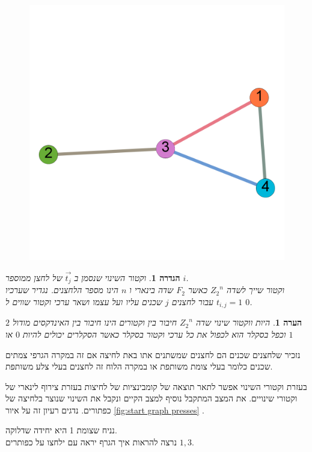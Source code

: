\documentclass[12pt,twoside]{article}
\newtheorem{definition}{הגדרה}[section]
\newtheorem{comm}{הערה}[section]
\newcommand{\Zn}{{Z_2}^n}
\begin{document}
\begin{figure}[ht]
    \caption{}
    \label{fig:numbering_graph}
    \unsethebrew
    \centering
    \includegraphics[width=.7\textwidth,height=.7\textheight,keepaspectratio]{images/numbering_graph.PNG}
\end{figure}
\sethebrew

\begin{definition}
    וקטור השינוי
    שנסמן ב
    $\vec{t_j}$
    של לחצן
    ממוספר
    $i$.
    \\
    וקטור
    שייך 
    לשדה 
    $\Zn$
    כאשר 
    $F_2$
    שדה בינארי
    ו 
    $n$
    הינו מספר הלחצנים.
    נגדיר שערכיו
    $t_{i,j} = 1$
    עבור
    לחצנים
    $j$
    שכנים עליו ועל עצמו
    ושאר ערכי וקטור שווים ל
    $0$.
\end{definition}

\begin{comm}
    היות ווקטור שינוי שדה
    $\Zn$
    חיבור בין וקטורים הינו חיבור בין האינדקסים מודול 
    $2$
    וכפל בסקלר
    הוא לכפול את כל ערכי וקטור בסקלר
    כאשר הסקלרים יכולים להיות
    $0$
    או 
    $1$
\end{comm}

נזכיר שלחצנים שכנים הם לחצנים שמשתנים אתו באת לחיצה 
אם זה במקרה הגרפי צמתים שכנים כלומר בעלי צומת משותפת
או במקרה הלוח זה לחצנים בעלי צלע משותפת.

בעזרת וקטורי השינוי אפשר לתאר תוצאה של קומבינציות של לחיצות
בעזרת צירוף לינארי של וקטורי שינויים.
את המצב המתקבל נוסיף למצב הקיים ונקבל את השינוי שנוצר בלחיצה של כפתורים.
נדגים רעיון זה על איור
\ref{fig:start graph presses}
.

נניח שצומת 1 היא יחידה שדלוקה.
\\
נרצה להראות איך הגרף יראה עם ילחצו על כפותרים 
$1, 3$.
\end{document}
